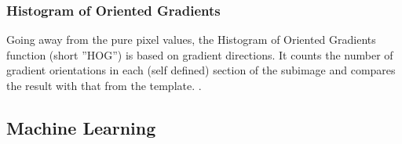 \subsubsection{Histogram of Oriented Gradients}
Going away from the pure pixel values, the Histogram of Oriented Gradients function (short ''HOG'') is based on gradient directions.
It counts the number of gradient orientations in each (self defined) section of the subimage and compares the result with that from the template.
\cite{hog_function}.

\subsection{Machine Learning}
